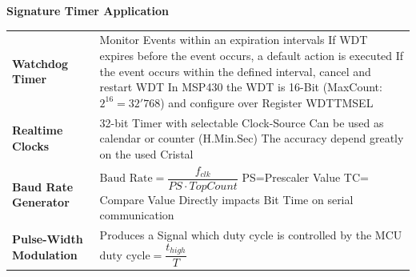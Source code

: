 \textbf{Signature Timer Application }\newline
\begin{tabular}{p{5cm} p{15cm}}
	\textbf{Watchdog Timer } &
    Monitor Events within an expiration intervals\newline
	 If WDT expires before the event occurs, a default action is executed\newline
	 If the event occurs within the defined interval, cancel and restart WDT\newline
	 In MSP430 the WDT is 16-Bit (MaxCount: $2^{16}=32'768$) \newline
	 and configure over Register WDTTMSEL\\
     
	\textbf{Realtime Clocks} &
    32-bit Timer with selectable Clock-Source\newline
    Can be used as calendar or counter (H.Min.Sec)\newline
    The accuracy depend greatly on the used Cristal\\
    
	\textbf{Baud Rate Generator} &
     $ \text{Baud Rate}=\dfrac{f_{clk}}{PS \cdot TopCount} $\newline
     PS=Prescaler Value \quad TC= Compare Value\newline
     Directly impacts Bit Time on serial communication\\
     
	\textbf{Pulse-Width Modulation} &
    Produces a Signal which duty cycle is controlled by the MCU \newline
    $ \text{duty cycle}=\dfrac{t_{high}}{T} $\\
\end{tabular}


\clearpage
\pagebreak